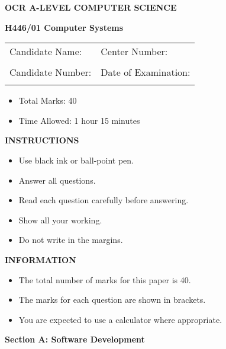 \documentclass[12pt]{article}
\begin{document}
\begin{center}
{\large \textbf{OCR A-LEVEL COMPUTER SCIENCE}}

\vspace{1cm}

{\Large \textbf{H446/01 Computer Systems}}

\vspace{1cm}

\begin{tabular}{|p{}|p{}|}
\hline
Candidate Name: & Center Number: \\
& \\
\hline
Candidate Number: & Date of Examination: \\
& \\
\hline
\end{tabular}

\vspace{1cm}

\begin{itemize}
\item[] Total Marks: 40
\item[] Time Allowed: 1 hour 15 minutes
\end{itemize}

\vspace{1cm}

\textbf{INSTRUCTIONS}
\begin{itemize}
\item Use black ink or ball-point pen.
\item Answer all questions.
\item Read each question carefully before answering.
\item Show all your working.
\item Do not write in the margins.
\end{itemize}

\textbf{INFORMATION}
\begin{itemize}
\item The total number of marks for this paper is 40.
\item The marks for each question are shown in brackets.
\item You are expected to use a calculator where appropriate.
\end{itemize}
\end{center}

\newpage

\begin{center}
{\Large \textbf{Section A: Software Development}}
\end{center}
\end{document}
